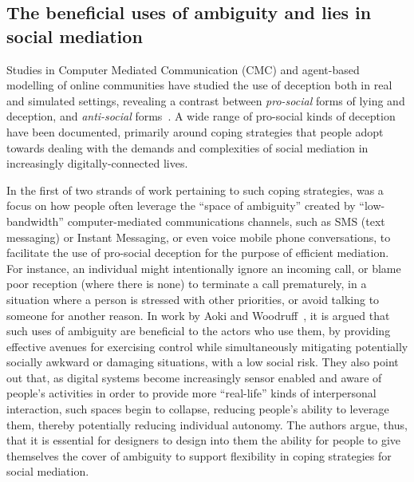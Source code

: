 \documentclass{IOS-Book-Article}     %
\begin{document}
\subsection{The beneficial uses of ambiguity and lies in social mediation}

Studies in Computer Mediated Communication (CMC) and agent-based modelling of
online communities have studied the use of deception both in real and simulated
settings, revealing a contrast between \emph{pro-social} forms of lying and
deception, and \emph{anti-social} forms~\cite{iniguez2014Deception}.
A wide range of pro-social kinds of deception have
been documented, primarily around coping strategies that people adopt towards
dealing with the demands and complexities of social mediation in increasingly
digitally-connected lives.            

In the first of two strands of work pertaining to such coping strategies, was a
focus on how people often leverage the ``space of ambiguity'' created by
``low-bandwidth'' computer-mediated communications channels, such as SMS (text
messaging) or Instant Messaging, or even voice mobile phone conversations, to
facilitate the use of pro-social deception for the purpose of efficient
mediation.  For instance, an individual might intentionally ignore an incoming
call, or blame poor reception (where there is none) to terminate a call
prematurely, in a situation where a person is stressed with other priorities, or
avoid talking to someone for another reason.  In work by Aoki and Woodruff~\cite{Aoki:2005:MSS:1054972.1054998}, it is argued that such uses of ambiguity
are beneficial to the actors who use them, by providing effective avenues for
exercising control while simultaneously mitigating potentially socially awkward
or damaging situations, with a low social risk.  They also point out that, as digital systems become increasingly
sensor enabled and aware of people's activities in order to provide more
``real-life'' kinds of interpersonal interaction, such spaces begin to collapse,
reducing people's ability to leverage them, thereby potentially reducing
individual autonomy.  The authors argue, thus, that it is essential for
designers to design into them the ability for people to give themselves the
cover of ambiguity to support flexibility in coping strategies for social
mediation.                     
\end{document}
